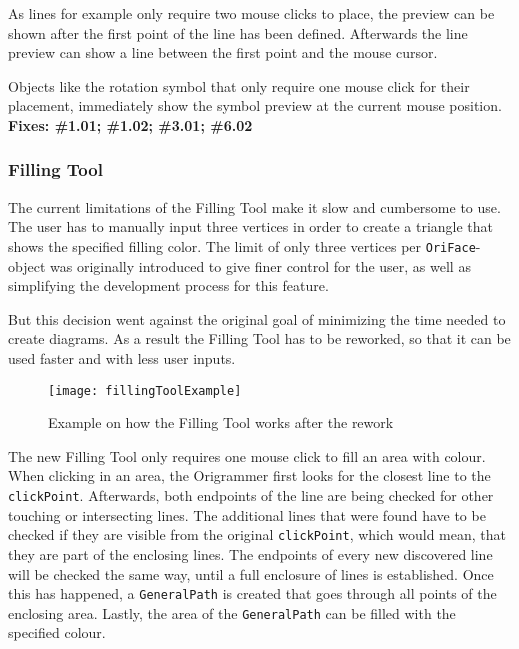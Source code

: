 As lines for example only require two mouse clicks to place, the preview can be shown after the first point of the line has been defined. Afterwards the line preview can show a line between the first point and the mouse cursor.

Objects like the rotation symbol that only require one mouse click for their placement, immediately show the symbol preview at the current mouse position.
\newline
\textbf{Fixes: \#1.01; \#1.02; \#3.01; \#6.02}

\newpage

\subsubsection{Filling Tool}

The current limitations of the Filling Tool make it slow and cumbersome to use. The user has to manually input three vertices in order to create a triangle that shows the specified filling color. The limit of only three vertices per \texttt{OriFace}-object was originally introduced to give finer control for the user, as well as simplifying the development process for this feature.

But this decision went against the original goal of minimizing the time needed to create diagrams. As a result the Filling Tool has to be reworked, so that it can be used faster and with less user inputs.

\begin{figure}[htbp]
	\centering
	\texttt{[image: fillingToolExample]}
	\caption{Example on how the Filling Tool works after the rework}
	\label{fig:fillingToolExample}
\end{figure}
\noindent The new Filling Tool only requires one mouse click to fill an area with colour. When clicking in an area, the Origrammer first looks for the closest line to the \texttt{clickPoint}. Afterwards, both endpoints of the line are being checked for other touching or intersecting lines. The additional lines that were found have to be checked if they are visible from the original \texttt{clickPoint}, which would mean, that they are part of the enclosing lines. The endpoints of every new discovered line will be checked the same way, until a full enclosure of lines is established. Once this has happened, a \texttt{GeneralPath} is created that goes through all points of the enclosing area. Lastly, the area of the \texttt{GeneralPath} can be filled with the specified colour.

